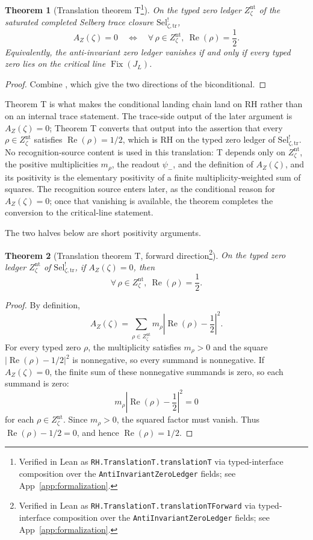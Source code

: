 \documentclass[11pt]{article}
\DeclareMathOperator{\Fix}{Fix}
\DeclareMathOperator{\Real}{Re}
\newcommand{\JL}{J_{L}}
\newcommand{\psimRH}{\psi_{-}}
\newcommand{\Znt}{Z_{\zeta}^{\mathrm{nt}}}
\newcommand{\AZ}{A_{Z}(\zeta)}
\newcommand{\Sel}{\mathrm{Sel}^{!}_{\zeta,\mathrm{tr}}}
\newtheorem{theorem}{Theorem}[section]
\theoremstyle{definition}
\begin{document}
\begin{theorem}[Translation theorem T\footnote{Verified in Lean as \nolinkurl{RH.TranslationT.translationT} via typed-interface composition over the \nolinkurl{AntiInvariantZeroLedger} fields; see App~\ref{app:formalization}.}]
\label{thm:rh:translation-T}
On the typed zero ledger \(\Znt\) of the saturated completed Selberg
trace closure \(\Sel\),
\[
  \AZ=0
  \quad\Longleftrightarrow\quad
  \forall\,\rho\in\Znt,\ \Real(\rho)=\frac{1}{2}.
\]
Equivalently, the anti-invariant zero ledger vanishes if and only if
every typed zero lies on the critical line \(\Fix(\JL)\).
\end{theorem}

\begin{proof}
Combine
,
which give the two directions of the biconditional.
\end{proof}

Theorem T is what makes the conditional landing chain land on RH
rather than on an internal trace statement.  The trace-side output
of the later argument is \(\AZ=0\); Theorem T converts that output
into the assertion that every \(\rho\in\Znt\) satisfies
\(\Real(\rho)=1/2\), which is RH on the typed zero ledger of
\(\Sel\).  No recognition-source content is used in this
translation: T depends only on \(\Znt\), the positive multiplicities
\(m_{\rho}\), the readout \(\psimRH\), and the definition of
\(\AZ\), and its positivity is the elementary positivity of a finite
multiplicity-weighted sum of squares.  The recognition source enters
later, as the conditional reason for \(\AZ=0\); once that vanishing
is available, the theorem completes the conversion to the
critical-line statement.

The two halves below are short positivity arguments.

\begin{theorem}[Translation theorem T, forward direction\footnote{Verified in Lean as \nolinkurl{RH.TranslationT.translationTForward} via typed-interface composition over the \nolinkurl{AntiInvariantZeroLedger} fields; see App~\ref{app:formalization}.}]
\label{thm:rh:translation-T-forward}
On the typed zero ledger \(\Znt\) of \(\Sel\), if \(\AZ=0\), then
\[
  \forall\,\rho\in\Znt,\ \Real(\rho)=\frac{1}{2}.
\]
\end{theorem}

\begin{proof}
By definition,
\[
  \AZ
    =
  \sum_{\rho\in\Znt}
    m_{\rho}\left|\Real(\rho)-\frac{1}{2}\right|^{2}.
\]
For every typed zero \(\rho\), the multiplicity satisfies
\(m_{\rho}>0\) and the square \(\left|\Real(\rho)-1/2\right|^{2}\)
is nonnegative, so every summand is nonnegative.  If \(\AZ=0\), the
finite sum of these nonnegative summands is zero, so each summand
is zero:
\[
  m_{\rho}\left|\Real(\rho)-\frac{1}{2}\right|^{2}=0
\]
for each \(\rho\in\Znt\).  Since \(m_{\rho}>0\), the squared factor
must vanish.  Thus \(\Real(\rho)-1/2=0\), and hence
\(\Real(\rho)=1/2\).
\end{proof}
\end{document}
